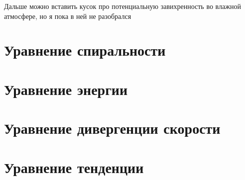 \begin{warn}
    Дальше можно вставить кусок про потенциальную завихренность во влажной атмосфере, но я пока в ней не разобрался
\end{warn}











\section{Уравнение спиральности}

\section{Уравнение энергии}

\section{Уравнение дивергенции скорости}

\section{Уравнение тенденции}

